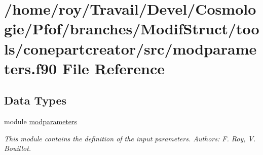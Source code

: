 \hypertarget{tools_2conepartcreator_2src_2modparameters_8f90}{\section{/home/roy/\-Travail/\-Devel/\-Cosmologie/\-Pfof/branches/\-Modif\-Struct/tools/conepartcreator/src/modparameters.f90 File Reference}
\label{tools_2conepartcreator_2src_2modparameters_8f90}
}
\subsection*{Data Types}
\begin{DoxyCompactItemize}
\item 
module \hyperlink{classmodparameters}{modparameters}
\begin{DoxyCompactList}\small\item\em This module contains the definition of the input parameters. Authors\-: F. Roy, V. Bouillot. \end{DoxyCompactList}\end{DoxyCompactItemize}
